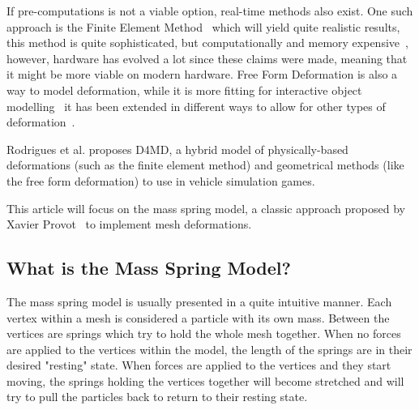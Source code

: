 If pre-computations is not a viable option, real-time methods also exist.
One such approach is the Finite Element Method~\cite{muller_fem} which will yield quite realistic results, this method is quite sophisticated, but computationally and memory expensive~\cite{rodrigues2005d4md}, however, hardware has evolved a lot since these claims were made, meaning that it might be more viable on modern hardware.
Free Form Deformation is also a way to model deformation, while it is more fitting for interactive object modelling~\cite{rodrigues2005d4md} it has been extended in different ways to allow for other types of deformation~\cite{coquillart_eefd}.

Rodrigues et al.\cite{rodrigues2005d4md} proposes D4MD, a hybrid model of physically-based deformations (such as the finite element method) and geometrical methods (like the free form deformation) to use in vehicle simulation games.

This article will focus on the mass spring model, a classic approach proposed by Xavier Provot~\cite{provot_mass_spring} to implement mesh deformations. 

\subsection{What is the Mass Spring Model?}
The mass spring model is usually presented in a quite intuitive manner.
Each vertex within a mesh is considered a particle with its own mass.
Between the vertices are springs which try to hold the whole mesh together.
When no forces are applied to the vertices within the model, the length of the springs are in their desired "resting" state.
When forces are applied to the vertices and they start moving, the springs holding the vertices together will become stretched
and will try to pull the particles back to return to their resting state\cite{catlike_mesh_deformation, mosegaards_clothing_simulation, provot_mass_spring}.
